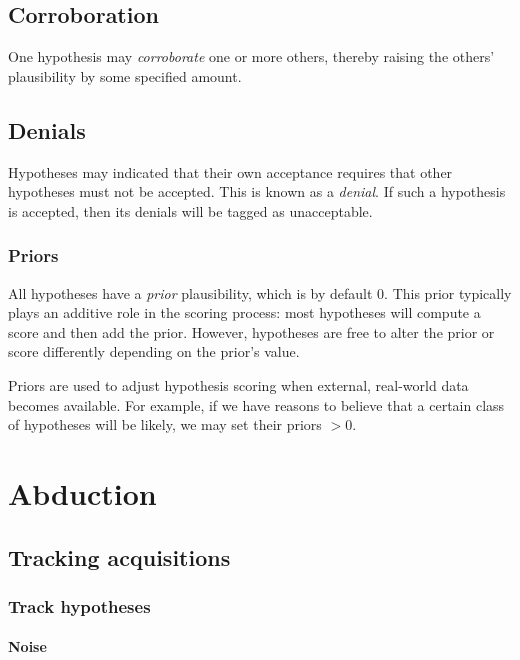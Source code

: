 \documentclass{book}
\begin{document}
\subsection{Corroboration}

One hypothesis may \emph{corroborate} one or more others, thereby raising the
others' plausibility by some specified amount.

\subsection{Denials}

Hypotheses may indicated that their own acceptance requires that other
hypotheses must not be accepted. This is known as a \emph{denial}. If such a
hypothesis is accepted, then its denials will be tagged as unacceptable.

\subsubsection{Priors}

All hypotheses have a \emph{prior} plausibility, which is by default 0. This
prior typically plays an additive role in the scoring process: most hypotheses
will compute a score and then add the prior. However, hypotheses are free to
alter the prior or score differently depending on the prior's value.

Priors are used to adjust hypothesis scoring when external, real-world data
becomes available. For example, if we have reasons to believe that a certain
class of hypotheses will be likely, we may set their priors $> 0$.

\section{Abduction}

\subsection{Tracking acquisitions}

\subsubsection{Track hypotheses}
\label{sec:track-hypotheses}

\paragraph{Noise}
\end{document}
